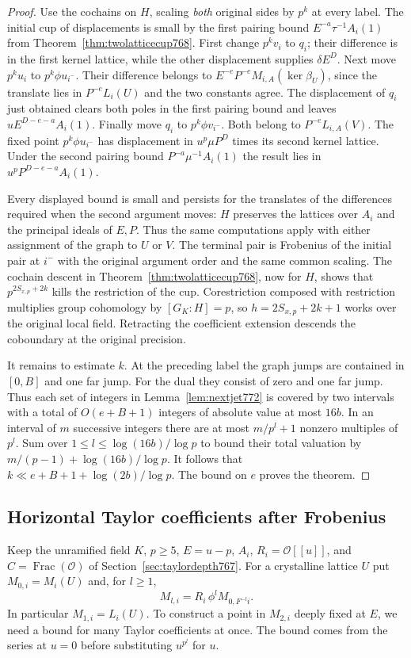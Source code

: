 \documentclass[a4paper,11pt]{article}
\theoremstyle{definition}
\theoremstyle{remark}
\numberwithin{equation}{section}
\begin{document}
\begin{proof}
Use the cochains on \(H\), scaling \emph{both} original
sides by \(p^k\) at every label. The initial cup of
displacements is small by the first pairing bound
\(E^{-a}\tau^{-1}A_i(1)\) from
Theorem~\ref{thm:twolatticecup768}. First change
\(p^kv_i\) to \(q_i\); their difference is in the first
kernel lattice, while the other displacement supplies
\(\delta E^D\). Next move \(p^k u_i\) to
\(p^k\phi u_{i^-}\). Their difference belongs to
\(E^{-e}P^{-e}M_{i,A}(\ker\beta_U)\), since the translate
lies in \(P^{-e}L_i(U)\) and the two constants agree.
The displacement of \(q_i\) just obtained clears both
poles in the first pairing bound and leaves
\(u E^{D-e-a} A_i(1)\). Finally move \(q_i\) to
\(p^k\phi v_{i^-}\). Both belong to \(P^{-e}L_{i,A}(V)\).
The fixed point \(p^k\phi u_{i^-}\) has displacement in
\(u^p\mu P^D\) times its second kernel lattice. Under the
second pairing bound \(P^{-a}\mu^{-1}A_i(1)\) the result
lies in \(u^p P^{D-e-a}A_i(1)\).

Every displayed bound is small and persists for the
translates of the differences required when the second
argument moves: \(H\) preserves the lattices over \(A_i\)
and the principal ideals of \(E,P\). Thus the same
computations apply with either assignment of the graph
to \(U\) or \(V\). The terminal pair is Frobenius of the
initial pair at \(i^-\) with the original argument order
and the same common scaling. The cochain descent in
Theorem~\ref{thm:twolatticecup768}, now for \(H\), shows
that \(p^{2S_{x,p}+2k}\) kills the restriction of the cup.
Corestriction composed with restriction multiplies group
cohomology by \([G_K:H]=p\), so \(h=2S_{x,p}+2k+1\)
works over the original local field. Retracting the
coefficient extension descends the coboundary at the
original precision.

It remains to estimate \(k\). At the preceding label the
graph jumps are contained in \([0,B]\) and one far jump.
For the dual they consist of zero and one far jump.
Thus each set of integers in Lemma~\ref{lem:nextjet772}
is covered by two intervals with a total of
\(O(e+B+1)\) integers of absolute value at most \(16b\).
In an interval of \(m\) successive integers there are
at most \(m/p^l+1\) nonzero multiples of \(p^l\).
Sum over \(1\le l\le\log(16b)/\log p\) to bound their
total valuation by \(m/(p-1)+\log(16b)/\log p\).
It follows that \(k\ll e+B+1+\log(2b)/\log p\).
The bound on \(e\) proves the theorem.
\end{proof}
\clearpage

\subsection{Horizontal Taylor coefficients after Frobenius}
\label{sec:horizontalradius774}
Keep the unramified field \(K\), \(p\ge5\), \(E=u-p\),
\(A_i\), \(R_i=\mathcal O[[u]]\), and \(C=\operatorname{Frac}(\mathcal O)\)
of Section~\ref{sec:taylordepth767}. For a crystalline
lattice \(U\) put \(M_{0,i}=M_i(U)\) and, for \(l\ge1\),
\[
      M_{l,i}=R_i\,\phi^l M_{0,F^{-l}i}.
\]
In particular \(M_{1,i}=L_i(U)\). To construct a point in
\(M_{2,i}\) deeply fixed at \(E\), we need a bound for
many Taylor coefficients at once. The bound comes from the
series at \(u=0\) before substituting \(u^{p^l}\) for \(u\).
\end{document}
